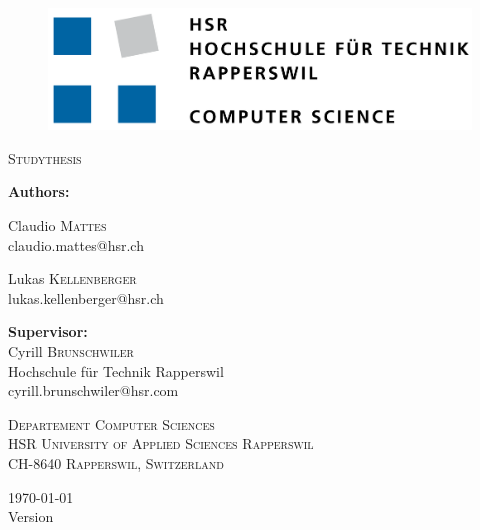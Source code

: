 \begin{titlepage}
	\centering
	\begin{figure}
		\centering
		\includegraphics[width=0.7\linewidth]{./assets/logo/hsr.png}  	
	\end{figure}

	{\scshape\Large Studythesis\par}
	\vspace{1.2cm}
	{\huge\bfseries \TITLE\par}
	\vspace{1.2cm}

	{\Large\textbf{Authors:} \\\vspace{0.2cm}}
	{\Large Claudio \textsc{Mattes} \\\small claudio.mattes@hsr.ch \par\vspace{0.2cm}
	\Large Lukas \textsc{Kellenberger} \\\small lukas.kellenberger@hsr.ch}

	\vspace{0.6cm}
	{\Large\textbf{Supervisor:} \\\vspace{0.2cm}}
	Cyrill \textsc{Brunschwiler}  \\ {\small Hochschule für Technik Rapperswil} \\\small cyrill.brunschwiler@hsr.com \\

	\vspace{0.6cm}

	\vfill
	{\scshape\scriptsize Departement Computer Sciences \\ HSR University of Applied Sciences Rapperswil \\ CH-8640 Rapperswil, Switzerland \par}

	\vfill

    {\large \today \\ \small Version \VERSION}
\end{titlepage}